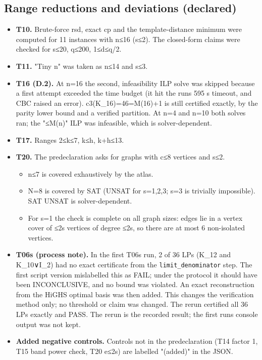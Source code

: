 \documentclass[
]{article}
\providecommand{\tightlist}{%
  \setlength{\itemsep}{0pt}\setlength{\parskip}{0pt}}
\begin{document}
\subsection{Range reductions and deviations
(declared)}\label{range-reductions-and-deviations-declared}

\begin{itemize}
\tightlist
\item
  \textbf{T10.} Brute-force rsd, exact cp and the template-distance
  minimum were computed for 11 instances with n≤16 (s≤2). The
  closed-form claims were checked for s≤20, q≤200, 1≤d≤q/2.
\item
  \textbf{T11.} "Tiny n" was taken as n≤14 and s≤3.
\item
  \textbf{T16 (D.2).} At n=16 the second, infeasibility ILP solve was
  skipped because a first attempt exceeded the time budget (it hit the
  run\textquotesingle s 595 s timeout, and CBC raised an error).
  c3(K\_16)=46=M(16)+1 is still certified exactly, by the parity lower
  bound and a verified partition. At n=4 and n=10 both solves ran; the
  "≤M(n)" ILP was infeasible, which is solver-dependent.
\item
  \textbf{T17.} Ranges 2≤k≤7, k≤h, k+h≤13.
\item
  \textbf{T20.} The predeclaration asks for graphs with c≤8 vertices and
  s≤2.

  \begin{itemize}
  \tightlist
  \item
    n≤7 is covered exhaustively by the atlas.
  \item
    N=8 is covered by SAT (UNSAT for s=1,2,3; s=3 is trivially
    impossible). SAT UNSAT is solver-dependent.
  \item
    For s=1 the check is complete on all graph sizes: edges lie in a
    vertex cover of ≤2s vertices of degree ≤2s, so there are at most 6
    non-isolated vertices.
  \end{itemize}
\item
  \textbf{T06s (process note).} In the first T06s run, 2 of 36 LPs
  (K\_12 and K\_10∨I\_2) had no exact certificate from the
  \texttt{limit\_denominator} step. The first script version mislabelled
  this as FAIL; under the protocol it should have been INCONCLUSIVE, and
  no bound was violated. An exact reconstruction from the HiGHS optimal
  basis was then added. This changes the verification method only; no
  threshold or claim was changed. The rerun certified all 36 LPs exactly
  and PASS. The rerun is the recorded result; the first
  run\textquotesingle s console output was not kept.
\item
  \textbf{Added negative controls.} Controls not in the predeclaration
  (T14 factor 1, T15 band power check, T20 e≤2s) are labelled "(added)"
  in the JSON.
\end{itemize}
\end{document}
